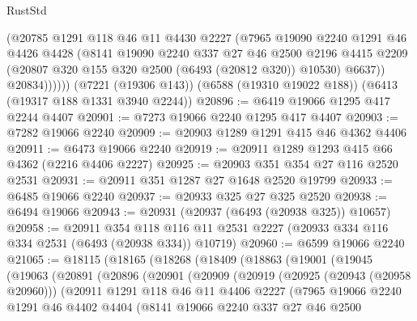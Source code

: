 \begin{lexlean}{RustStd}
\begin{coremodule}
              (@20785
                @1291
                @118
                @46
                @11
                @4430
                @2227
                (@7965
                  @19090
                  @2240
                  @1291
                  @46
                  @4426
                  @4428
                  (@8141
                    @19090
                    @2240
                    @337
                    @27
                    @46
                    @2500
                    @2196
                    @4415
                    @2209
                    (@20807 @320 @155 @320 @2500 (@6493 (@20812 @320)) @10530)
                    @6637))
                @20834))))))
    (@7221 (@19306 @143))
    (@6588 (@19310 @19022 @188))
    (@6413 (@19317 @188 @1331 @3940 @2244))
@20896 := @6419 @19066 @1295 @417 @2244 @4407
@20901 := @7273 @19066 @2240 @1295 @417 @4407
@20903 := @7282 @19066 @2240
@20909 := @20903 @1289 @1291 @415 @46 @4362 @4406
@20911 := @6473 @19066 @2240
@20919 := @20911 @1289 @1293 @415 @66 @4362 (@2216 @4406 @2227)
@20925 := @20903 @351 @354 @27 @116 @2520 @2531
@20931 := @20911 @351 @1287 @27 @1648 @2520 @19799
@20933 := @6485 @19066 @2240
@20937 := @20933 @325 @27 @325 @2520
@20938 := @6494 @19066
@20943 := @20931 (@20937 (@6493 (@20938 @325)) @10657)
@20958 := @20911
    @354
    @118
    @116
    @11
    @2531
    @2227
    (@20933 @334 @116 @334 @2531 (@6493 (@20938 @334)) @10719)
@20960 := @6599 @19066 @2240
@21065 := @18115
    (@18165
      (@18268
        (@18409
          (@18863
            (@19001
              (@19045
                (@19063
                  (@20891
                    (@20896
                      (@20901
                        (@20909
                          (@20919
                            (@20925 (@20943 (@20958 @20960)))
                            (@20911
                              @1291
                              @118
                              @46
                              @11
                              @4406
                              @2227
                              (@7965
                                @19066
                                @2240
                                @1291
                                @46
                                @4402
                                @4404
                                (@8141
                                  @19066
                                  @2240
                                  @337
                                  @27
                                  @46
                                  @2500

\end{coremodule}
\end{lexlean}
